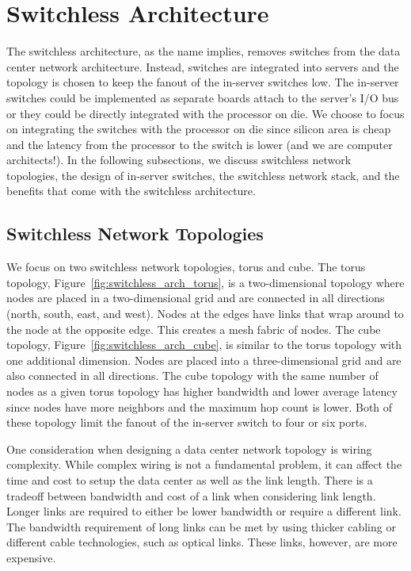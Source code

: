 \section{Switchless Architecture}
\label{sec:arch}

The switchless architecture, as the name implies, removes switches from the data center network architecture.  Instead, switches are integrated into servers and the topology is chosen to keep the fanout of the in-server switches low.  The in-server switches could be implemented as separate boards attach to the server's I/O bus or they could be directly integrated with the processor on die.  We choose to focus on integrating the switches with the processor on die since silicon area is cheap and the latency from the processor to the switch is lower (and we are computer architects!).  In the following subsections, we discuss switchless network topologies, the design of in-server switches, the switchless network stack, and the benefits that come with the switchless architecture.

\subsection{Switchless Network Topologies}

We focus on two switchless network topologies, torus and cube.  The torus topology, Figure~\ref{fig:switchless_arch_torus}, is a two-dimensional topology where nodes are placed in a two-dimensional grid and are connected in all directions (north, south, east, and west).  Nodes at the edges have links that wrap around to the node at the opposite edge.  This creates a mesh fabric of nodes.  The cube topology, Figure~\ref{fig:switchless_arch_cube}, is similar to the torus topology with one additional dimension.  Nodes are placed into a three-dimensional grid and are also connected in all directions.  The cube topology with the same number of nodes as a given torus topology has higher bandwidth and lower average latency since nodes have more neighbors and the maximum hop count is lower.  Both of these topology limit the fanout of the in-server switch to four or six ports.

One consideration when designing a data center network topology is wiring complexity.  While complex wiring is not a fundamental problem, it can affect the time and cost to setup the data center as well as the link length.  There is a tradeoff between bandwidth and cost of a link when considering link length.  Longer links are required to either be lower bandwidth or require a different link.  The bandwidth requirement of long links can be met by using thicker cabling or different cable technologies, such as optical links.  These links, however, are more expensive.


